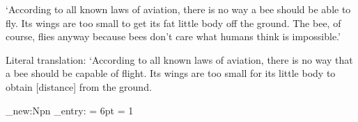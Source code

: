 \documentclass[a4paper, 12pt, oneside, final]{article}
\let \nf \normalfont
\begin{document}
\medskip\noindent
‘According to all known laws of aviation, there is no way a bee should be able to fly. Its wings are too
small to get its fat little body off the ground. The bee, of course, flies anyway because bees don't care
what humans think is impossible.’

\medskip\noindent
Literal translation: ‘According to all known laws of aviation, there is no way that a bee should be capable of flight.
Its wings are too small for its little body to obtain [distance] from the ground.




\clearpage
\def\leftmark{\firstmark\ | \botmark}
\let\rightmark\leftmark


\ExplSyntaxOn

\cs_new:Npn \start_entry: {
    \hangindent = 6pt
    \hangafter = 1
    \noindent
}

\def \pfabbr {{\normalfont\scshape  pf \space }}

\long {}

\long {}

\ExplSyntaxOff


\end{document}
